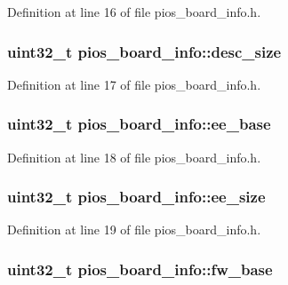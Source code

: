 \-Definition at line 16 of file pios\-\_\-board\-\_\-info.\-h.

\hypertarget{structpios__board__info_aab7aa8138d0df454158a720741756931}{
\subsubsection[{desc\-\_\-size}]{\setlength{\rightskip}{0pt plus 5cm}uint32\-\_\-t {\bf pios\-\_\-board\-\_\-info\-::desc\-\_\-size}}}\label{structpios__board__info_aab7aa8138d0df454158a720741756931}


\-Definition at line 17 of file pios\-\_\-board\-\_\-info.\-h.

\hypertarget{structpios__board__info_a67ef167840d1d40c2ea296544f664c22}{
\subsubsection[{ee\-\_\-base}]{\setlength{\rightskip}{0pt plus 5cm}uint32\-\_\-t {\bf pios\-\_\-board\-\_\-info\-::ee\-\_\-base}}}\label{structpios__board__info_a67ef167840d1d40c2ea296544f664c22}


\-Definition at line 18 of file pios\-\_\-board\-\_\-info.\-h.

\hypertarget{structpios__board__info_a3ffc56de2b782e6e19c33e68ffd9716d}{
\subsubsection[{ee\-\_\-size}]{\setlength{\rightskip}{0pt plus 5cm}uint32\-\_\-t {\bf pios\-\_\-board\-\_\-info\-::ee\-\_\-size}}}\label{structpios__board__info_a3ffc56de2b782e6e19c33e68ffd9716d}


\-Definition at line 19 of file pios\-\_\-board\-\_\-info.\-h.

\hypertarget{structpios__board__info_ab478e3140ec858f6347f061cf10d8cf5}{
\subsubsection[{fw\-\_\-base}]{\setlength{\rightskip}{0pt plus 5cm}uint32\-\_\-t {\bf pios\-\_\-board\-\_\-info\-::fw\-\_\-base}}}\label{structpios__board__info_ab478e3140ec858f6347f061cf10d8cf5}


